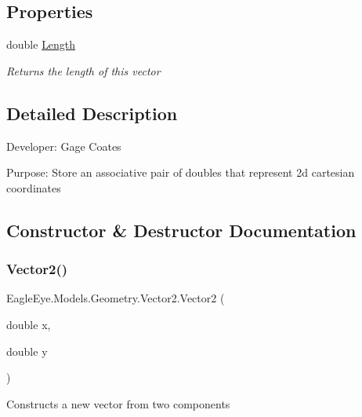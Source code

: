 \subsection*{Properties}
\begin{DoxyCompactItemize}
\item 
double \mbox{\hyperlink{struct_eagle_eye_1_1_models_1_1_geometry_1_1_vector2_ab34c91570ff8b9bd67cec2ddee176893}{Length}}
\begin{DoxyCompactList}\small\item\em Returns the length of this vector \end{DoxyCompactList}\end{DoxyCompactItemize}


\subsection{Detailed Description}
Developer\+: Gage Coates 

Purpose\+: Store an associative pair of doubles that represent 2d cartesian coordinates 

\subsection{Constructor \& Destructor Documentation}
\mbox{\label{struct_eagle_eye_1_1_models_1_1_geometry_1_1_vector2_ab45ce16ef5b5d8abf10b92a8ce38bea0}} 
\subsubsection{\texorpdfstring{Vector2()}{Vector2()}}
{\footnotesize\ttfamily Eagle\+Eye.\+Models.\+Geometry.\+Vector2.\+Vector2 (\begin{DoxyParamCaption}\item[{double}]{x,  }\item[{double}]{y }\end{DoxyParamCaption})}



Constructs a new vector from two components 


